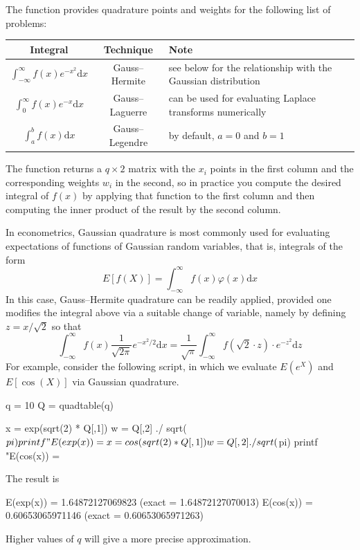 The  function provides quadrature points and weights
for the following list of problems:
\begin{center}
\begin{tabular}{ccp{}}
  \hline
  \textbf{Integral} & \textbf{Technique} & \textbf{Note}\\
  \hline
  $\int_{-\infty}^{\infty} f(x) e^{-x^2} \mathrm{d}x$ &
  Gauss--Hermite & see below for the relationship with the Gaussian distribution\\
  $\int_{0}^{\infty} f(x) e^{-x} \mathrm{d}x$ &
  Gauss--Laguerre & can be used for evaluating Laplace transforms numerically \\
  $\int_{a}^{b} f(x) \mathrm{d}x$ &
  Gauss--Legendre & by default, $a=0$ and $b=1$ \\
  \hline
\end{tabular}
\end{center}
The  function returns a $q \times 2$ matrix with the
$x_i$ points in the first column and the corresponding weights $w_i$
in the second, so in practice you compute the desired integral of
$f(x)$ by applying that function to the first column and then
computing the inner product of the result by the second column.

In econometrics, Gaussian quadrature is most commonly used for
evaluating expectations of functions of Gaussian random variables,
that is, integrals of the form
\[
  E\left[f(X)\right] = \int_{-\infty}^{\infty} f(x) \varphi(x)
  \mathrm{d} x
\]
In this case, Gauss--Hermite quadrature can be readily applied,
provided one modifies the integral above via a suitable change of
variable, namely by defining $z = x/\sqrt{2}$ so that
\[
  \int_{-\infty}^{\infty} f(x) \frac{1}{\sqrt{2 \pi}} e^{-x^2/2}
  \mathrm{d} x =
  \frac{1}{\sqrt{\pi}} \int_{-\infty}^{\infty} f(\sqrt{2} \cdot z)
  \cdot  e^{-z^2}
  \mathrm{d} z
\]
For example, consider the following script, in which we evaluate
$E(e^X)$ and $E[\cos(X)]$ via Gaussian quadrature.
\begin{code}
q = 10
Q = quadtable(q)

x = exp(sqrt(2) * Q[,1])
w = Q[,2] ./ sqrt($pi) 
printf "E(exp(x)) = %

x = cos(sqrt(2) * Q[,1])
w = Q[,2] ./ sqrt($pi) 
printf "E(cos(x)) = %
\end{code}
The result is
\begin{code}
E(exp(x)) = 1.64872127069823 (exact = 1.64872127070013)
E(cos(x)) = 0.60653065971146 (exact = 0.60653065971263)
\end{code}
Higher values of $q$ will give a more precise approximation.

